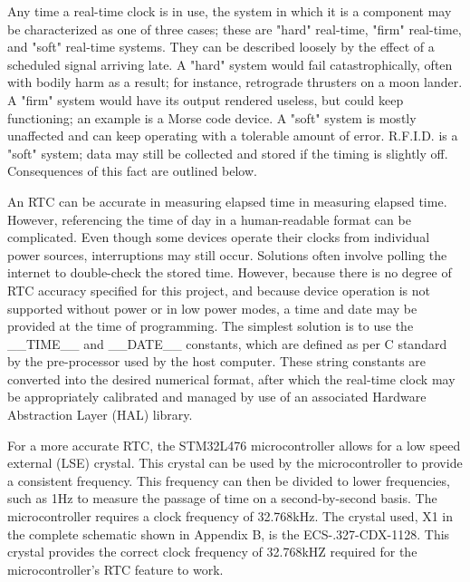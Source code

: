 Any time a real-time clock is in use, the system in which it is a component may be characterized as one of three cases; these are "hard" real-time, "firm" real-time, and "soft" real-time systems. They can be described loosely by the effect of a scheduled signal arriving late. A "hard" system would fail catastrophically, often with bodily harm as a result; for instance, retrograde thrusters on a moon lander. A "firm" system would have its output rendered useless, but could keep functioning; an example is a Morse code device. A "soft" system is mostly unaffected and can keep operating with a tolerable amount of error. R.F.I.D. is a "soft" system; data may still be collected and stored if the timing is slightly off. Consequences of this fact are outlined below.
\par


An RTC can be accurate in measuring elapsed time in measuring elapsed time. However, referencing the time of day in a human-readable format can be complicated. Even though some devices operate their clocks from individual power sources, interruptions may still occur. Solutions often involve polling the internet to double-check the stored time. However, because there is no degree of RTC accuracy specified for this project, and because device operation is not supported without power or in low power modes, a time and date may be provided at the time of programming. The simplest solution is to use the \_\_TIME\_\_ and \_\_DATE\_\_ constants, which are defined as per C standard by the pre-processor used by the host computer. These string constants are converted into the desired numerical format, after which the real-time clock may be appropriately calibrated and managed by use of an associated Hardware Abstraction Layer (HAL) library.
\par
For a more accurate RTC, the STM32L476 microcontroller allows for a low speed external (LSE) crystal. This crystal can be used by the microcontroller to provide a consistent frequency. This frequency can then be divided to lower frequencies, such as 1Hz to measure the passage of time on a second-by-second basis. The microcontroller requires a clock frequency of 32.768kHz. The crystal used, X1 in the complete schematic shown in Appendix B, is the ECS-.327-CDX-1128. This crystal provides the correct clock frequency of 32.768kHZ required for the microcontroller's RTC feature to work.


